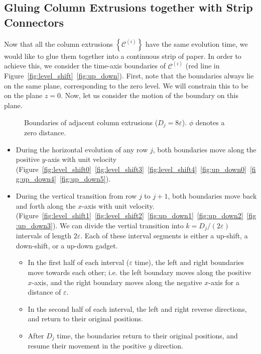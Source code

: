 \subsection{Gluing Column Extrusions together with Strip Connectors}
\label{sec:strip_connectors}

Now that all the column extrusions $\left\{ \mathcal C^{(i)} \right\}$ have the same evolution time,
we would like to glue them together into a continuous strip of paper.
In order to achieve this, we consider the time-axis boundaries of $\mathcal C^{(i)}$ (red line in Figure~\ref{fig:level_shift}~\ref{fig:up_down}).
First, note that the boundaries always lie on the same plane, corresponding to the zero level.
We will constrain this to be on the plane $z=0$. Now, let us consider the motion of the boundary on this plane.\\
\graphicspath{{./figures/}}
\begin{wrapfigure}{r}{0.35\textwidth}
    \def\svgwidth{0.35\textwidth}
    \caption{Boundaries of adjacent column extrusions ($D_j = 8\varepsilon$). $\phi$ denotes a zero distance.}
    \label{fig:boundaries}
\end{wrapfigure}

\begin{itemize}
    \item During the horizontal evolution of any row $j$, both boundaries move along the positive $y$-axis with unit velocity
          (Figure~\ref{fig:level_shift0}~\ref{fig:level_shift3}~\ref{fig:level_shift4}~\ref{fig:up_down0}~\ref{fig:up_down4}~\ref{fig:up_down5}).
    \item During the vertical transition from row $j$ to $j+1$, both boundaries move back and forth along the $x$-axis with unit velocity.
          (Figure~\ref{fig:level_shift1}~\ref{fig:level_shift2}~\ref{fig:up_down1}~\ref{fig:up_down2}~\ref{fig:up_down3}).
          We can divide the vertial transition into $k = D_j/(2\varepsilon)$ intervals of length $2\varepsilon$.
          Each of these interval segments is either a up-shift, a down-shift, or a up-down gadget.
    \begin{itemize}
        \item In the first half of each interval ($\varepsilon$ time), the left and right boundaries move towards each other;
              i.e. the left boundary moves along the positive $x$-axis,
              and the right boundary moves along the negative $x$-axis for a distance of $\varepsilon$.
        \item In the second half of each interval, the left and right reverse directions, and return to their original positions.
        \item After $D_j$ time, the boundaries return to their original positions, and resume their movement in the positive $y$ direction.
    \end{itemize}
\end{itemize}

